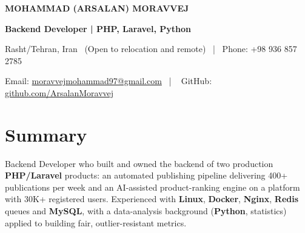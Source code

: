 \documentclass[10pt,a4paper]{article}
\begin{document}
{\Huge\bfseries\color{primary}MOHAMMAD (ARSALAN) MORAVVEJ}\par
\vspace{2pt}
{\large\bfseries\color{accent}Backend Developer | PHP, Laravel, Python}\par
\vspace{4pt}
{\small
Rasht/Tehran, Iran \ (Open to relocation and remote) \ | \
Phone: +98 936 857 2785  \par
Email: \href{mailto:moravvejmohammad97@gmail.com}{moravvejmohammad97@gmail.com} \ | \
GitHub: \href{https://github.com/ArsalanMoravvej}{github.com/ArsalanMoravvej}
}

\section{Summary}
Backend Developer who built and owned the backend of two production \textbf{PHP/Laravel} products: an automated publishing pipeline delivering 400+ publications per week and an AI-assisted product-ranking engine on a platform with 30K+ registered users. Experienced with \textbf{Linux}, \textbf{Docker}, \textbf{Nginx}, \textbf{Redis} queues and \textbf{MySQL}, with a data-analysis background (\textbf{Python}, statistics) applied to building fair, outlier-resistant metrics.
\end{document}
